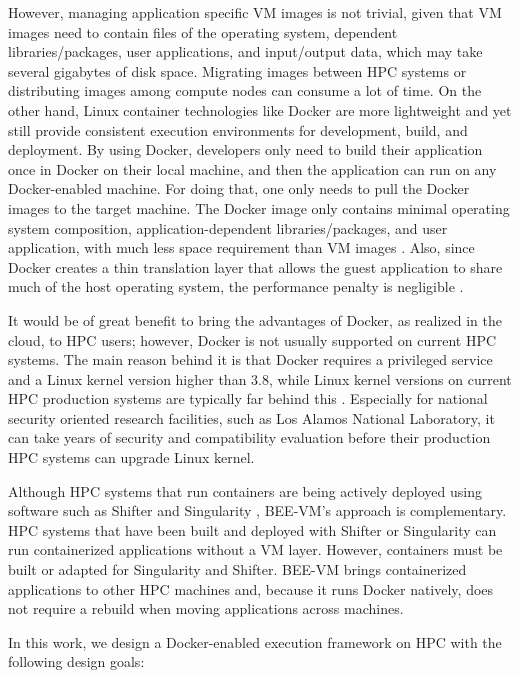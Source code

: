 However, managing application specific VM images is not trivial, given that VM images need to contain files of the operating system, dependent libraries/packages, user applications, and input/output data, which may take several gigabytes of disk space. Migrating images between HPC systems or distributing images among compute nodes can consume a lot of time. On the other hand, Linux container technologies like Docker \cite{Docker, awscontainer} are more lightweight and yet still provide consistent execution environments for development, build, and deployment. By using Docker, developers only need to build their application once in Docker on their local machine, and then the application can run on any Docker-enabled machine. For doing that, one only needs to pull the Docker images to the target machine. The Docker image only contains minimal operating system composition, application-dependent libraries/packages, and user application, with much less space requirement than VM images \cite{boettiger2015introduction}. Also, since Docker creates a thin translation layer that allows the guest application to share much of the host operating system, the performance penalty is negligible \cite{merkel2014docker, ruan2016performance}.

It would be of great benefit to bring the advantages of Docker, as realized in the cloud, to HPC users; however, Docker is not usually supported on current HPC systems. The main reason behind it is that Docker requires a privileged service and a Linux kernel version higher than 3.8, while Linux kernel versions on current HPC production systems are typically far behind this \cite{harji2013our}. Especially for national security oriented research facilities, such as Los Alamos National Laboratory, it can take years of security and compatibility evaluation before their production HPC systems can upgrade Linux kernel. 

Although HPC systems that run containers are being actively deployed using software such as Shifter \cite{jacobsen2015contain} and Singularity \cite{kurtzer_2016_60736}, BEE-VM's approach is complementary.  HPC systems that have been built and deployed with Shifter or Singularity can run containerized applications without a VM layer. However, containers must be built or adapted for Singularity and Shifter.  BEE-VM brings containerized applications to other HPC machines and, because it runs Docker natively, does not require a rebuild when moving applications across machines. 

In this work, we design a Docker-enabled execution framework on HPC with the following design goals:


